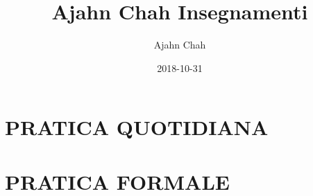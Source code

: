 \documentclass[
  final,
  babelLanguage=italian,
]{anecdote}
\title{Ajahn Chah Insegnamenti}
\subtitle{}
\author{Ajahn Chah}
\date{2018-10-31}
\begin{document}
\frontmatter

\ifdesktopversion
{}
\fi







\cleartorecto
\tableofcontents*







\mainmatter

\part{PRATICA QUOTIDIANA}



































\part{PRATICA FORMALE}
\end{document}
